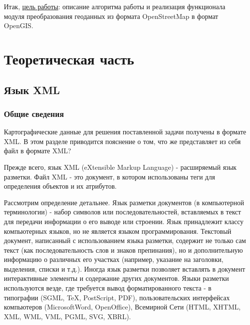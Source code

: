 \documentclass[12pt,a4paper,oneside]{article} %
\begin{document}
{Итак, \underline{цель работы}: описание алгоритма работы \linebreak
и реализация функционала модуля преобразования геоданных \linebreak
из формата OpenStreetMap в формат OpenGIS.}

\newpage
\section{Теоретическая часть}

\subsection{Язык XML}

\subsubsection{Общие сведения}

Картографические данные для решения поставленной задачи получены \linebreak
в формате XML. В этом разделе приводится пояснение о том, что же \linebreak
представляет из себя файл в формате XML?

Прежде всего, язык XML (eXtensible Markup Language) - расширяемый \linebreak
язык разметки. Файл XML - это документ, в котором использованы \linebreak
теги для определения объектов и их атрибутов.

Рассмотрим определение детальнее. Язык разметки документов \linebreak
(в компьютерной терминологии) - набор символов или \linebreak
последовательностей, вставляемых в текст для передачи информации \linebreak
о его выводе или строении. Язык принадлежит классу компьютерных \linebreak
языков, но не является языком программирования. Текстовый документ,\linebreak
написанный с использованием языка разметки, содержит не только \linebreak
сам текст (как последовательность слов и знаков препинания), но и \linebreak
дополнительную информацию о различных его участках (например, \linebreak
указание на заголовки, выделения, списки и т.д.). Иногда язык разметки \linebreak
позволяет вставлять в документ интерактивные элементы и содержание \linebreak
других документов. Языки разметки используются везде, где требуется \linebreak
вывод форматированного текста - в типографии (SGML,  TeX, PostScript, \linebreak
PDF), пользовательских интерфейсах компьютеров (MicrosoftWord, \linebreak
OpenOffice), Всемирной Сети (HTML,  XHTML,  XML,  WML,  VML,  PGML,  \linebreak
SVG,  XBRL).
\end{document}
